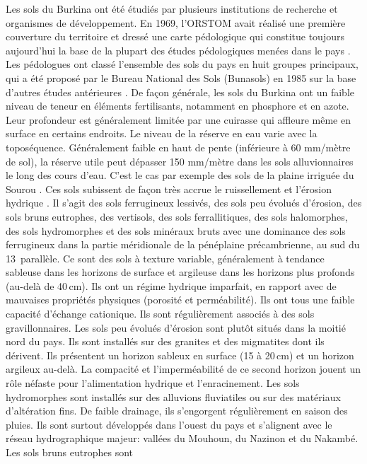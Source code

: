 \documentclass[a4paper,11pt]{article}
\begin{document}
Les sols du Burkina ont été étudiés par plusieurs institutions de
recherche et organismes de développement. En 1969, l'ORSTOM avait
réalisé une première couverture du territoire et dressé une carte
pédologique qui constitue toujours aujourd'hui la base de la plupart
des études pédologiques menées dans le pays \cite{BUNASOLS_1985}.  Les
pédologues ont classé l'ensemble des sols du pays en huit groupes
principaux, qui a été proposé par le Bureau National des Sols
(Bunasols) en 1985 sur la base d'autres études antérieures
\cite{PERON_1975}. De façon générale, les sols du Burkina ont un
faible niveau de teneur en éléments fertilisants, notamment en
phosphore et en azote. Leur profondeur est généralement limitée par
une cuirasse qui affleure même en surface en certains endroits. Le
niveau de la réserve en eau varie avec la toposéquence. Généralement
faible en haut de pente (inférieure à 60 mm/mètre de sol), la réserve
utile peut dépasser 150 mm/mètre dans les sols alluvionnaires le long
des cours d'eau. C'est le cas par exemple des sols de la plaine
irriguée du Sourou \cite{SOMENICOU_1983}. Ces sols subissent de façon
très accrue le ruissellement et l'érosion hydrique
\cite{Roose_2004}. Il s'agit des sols ferrugineux lessivés, des sols
peu évolués d'érosion, des sols bruns eutrophes, des vertisols, des
sols ferrallitiques, des sols halomorphes, des sols hydromorphes et
des sols minéraux bruts avec une dominance des sols ferrugineux dans
la partie méridionale de la pénéplaine précambrienne, au sud du
13\ieme\, parallèle. Ce sont des sols à texture variable, généralement
à tendance sableuse dans les horizons de surface et argileuse dans les
horizons plus profonds (au-delà de 40\,cm). Ils ont un régime hydrique
imparfait, en rapport avec de mauvaises propriétés physiques (porosité
et perméabilité). Ils ont tous une faible capacité d'échange
cationique. Ils sont régulièrement associés à des sols
gravillonnaires. Les sols peu évolués d'érosion sont plutôt situés
dans la moitié nord du pays. Ils sont installés sur des granites et
des migmatites dont ils dérivent. Ils présentent un horizon sableux en
surface (15 à 20\,cm) et un horizon argileux au-delà. La compacité et
l'imperméabilité de ce second horizon jouent un rôle néfaste pour
l'alimentation hydrique et l'enracinement. Les sols hydromorphes sont
installés sur des alluvions fluviatiles ou sur des matériaux
d'altération fins. De faible drainage, ils s'engorgent régulièrement
en saison des pluies. Ils sont surtout développés dans l'ouest du pays
et s'alignent avec le réseau hydrographique majeur: vallées du
Mouhoun, du Nazinon et du Nakambé. Les sols bruns eutrophes sont
\end{document}
